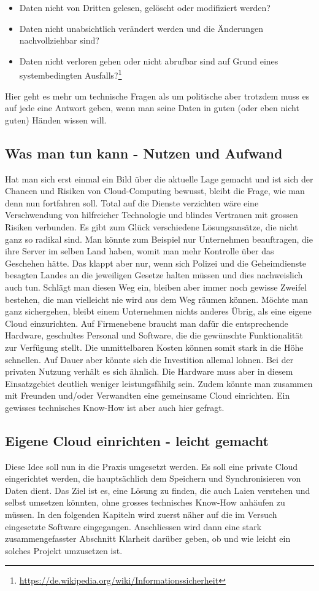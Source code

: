 \begin{itemize}
\item Daten nicht von Dritten gelesen, gelöscht oder modifiziert werden?
\item Daten nicht unabsichtlich verändert werden und die Änderungen nachvollziehbar sind?
\item Daten nicht verloren gehen oder nicht abrufbar sind auf Grund eines systembedingten Ausfalls?\footnote{\url{https://de.wikipedia.org/wiki/Informationssicherheit}}
\end{itemize}

Hier geht es mehr um technische Fragen als um politische aber trotzdem muss es auf jede eine Antwort geben, wenn man seine Daten in guten (oder eben nicht guten) Händen wissen will.

\subsection{Was man tun kann - Nutzen und Aufwand}
Hat man sich erst einmal ein Bild über die aktuelle Lage gemacht und ist sich der Chancen und Risiken von Cloud-Computing bewusst, bleibt die Frage, wie man denn nun fortfahren soll. Total auf die Dienste verzichten wäre eine Verschwendung von hilfreicher Technologie und blindes Vertrauen mit grossen Risiken verbunden. Es gibt zum Glück verschiedene Lösungsansätze, die nicht ganz so radikal sind. Man könnte zum Beispiel nur Unternehmen beauftragen, die ihre Server im selben Land haben, womit man mehr Kontrolle über das Geschehen hätte. Das klappt aber nur, wenn sich Polizei und die Geheimdienste besagten Landes an die jeweiligen Gesetze halten müssen und dies nachweislich auch tun. Schlägt man diesen Weg ein, bleiben aber immer noch gewisse Zweifel bestehen, die man vielleicht nie wird aus dem Weg räumen können. Möchte man ganz sichergehen, bleibt einem Unternehmen nichts anderes Übrig, als eine eigene Cloud einzurichten. Auf Firmenebene braucht man dafür die entsprechende Hardware, geschultes Personal und  Software, die die gewünschte Funktionalität zur Verfügung stellt. Die unmittelbaren Kosten können somit stark in die Höhe schnellen. Auf Dauer aber könnte sich die Investition allemal lohnen. Bei der privaten Nutzung verhält es sich ähnlich. Die Hardware muss aber in diesem Einsatzgebiet deutlich weniger leistungsfähilg sein. Zudem könnte man zusammen mit Freunden und/oder Verwandten eine gemeinsame Cloud einrichten. Ein gewisses technisches Know-How ist aber auch hier gefragt.

\subsection{Eigene Cloud einrichten - leicht gemacht}
Diese Idee soll nun in die Praxis umgesetzt werden. Es soll eine private Cloud eingerichtet werden, die hauptsächlich dem Speichern und Synchronisieren von Daten dient. Das Ziel ist es, eine Lösung zu finden, die auch Laien verstehen und selbst umsetzen könnten, ohne grosses technisches Know-How anhäufen zu müssen. In den folgenden Kapiteln wird zuerst näher auf die im Versuch eingesetzte Software eingegangen. Anschliessen wird dann eine stark zusammengefasster Abschnitt Klarheit darüber geben, ob und wie leicht ein solches Projekt umzusetzen ist.

